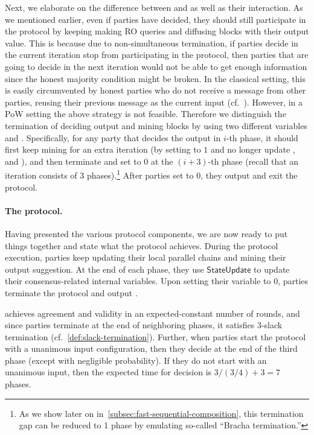 Next, we elaborate on the difference between \decide and \exit as well as their interaction.
%
As we mentioned earlier, even if parties have decided, they should still participate in the protocol by keeping making RO queries and diffusing blocks with their output value.
%
This is because due to non-simultaneous termination, if parties decide in the current iteration stop from participating in the protocol, then parties that are going to decide in the next iteration would not be able to get enough information since the honest majority condition might be broken.
%
In the classical setting, this is easily circumvented by honest parties who do not receive a message from other parties, reusing their previous message as the current input (cf.~\cite{STOC:FelMic88,C:KatKoo06}).
%
However, in a PoW setting the above strategy is not feasible.
%
Therefore we distinguish the termination of deciding output and mining blocks by using two different variables \decide and \exit.
%
Specifically, for any party that decides the output in $i$-th phase, it should first keep mining for an extra iteration (by setting \exit to $1$ and no longer update \val, \lock and \decide), and then terminate and set \exit to $0$ at the $(i + 3)$-th phase (recall that an iteration consists of 3 phases).\footnote{As we show later on in~\cref{subsec:fast-sequential-composition}, this termination gap can be reduced to 1 phase by emulating so-called ``Bracha termination.''}
%
After parties set \exit to $0$, they output \val and exit the protocol.

\paragraph{The \chainKingConsensus protocol.}
%
Having presented the various protocol components, we are now ready to put things together and state what the protocol achieves.
%
During the protocol execution, parties keep updating their local parallel chains and mining their output suggestion.
%
At the end of each phase, they use $\mathsf{StateUpdate}$ to update their consensus-related internal variables.
%
Upon setting their \exit variable to 0, parties terminate the protocol and output \val.



\chainKingConsensus achieves agreement and validity in an expected-constant number of rounds, and since parties terminate at the end of neighboring phases, it satisfies 3-slack termination (cf.~\cref{def:slack-termination}).
%
Further, when parties start the protocol with a unanimous input configuration, then they decide at the end of the third phase (except with negligible probability).
%
If they do not start with an unanimous input, then the expected time for decision is $3 / (3/4) + 3 = 7$ phases.

